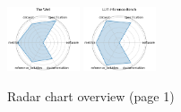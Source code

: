 \begin{figure}[ht!]
\includegraphics[width=0.1900\textwidth]{images/the_well_radar.pdf}
\includegraphics[width=0.1900\textwidth]{images/llm-inference-bench_radar.pdf}
\\[1ex]
\caption{Radar chart overview (page 1)}
\end{figure}


\clearpage

